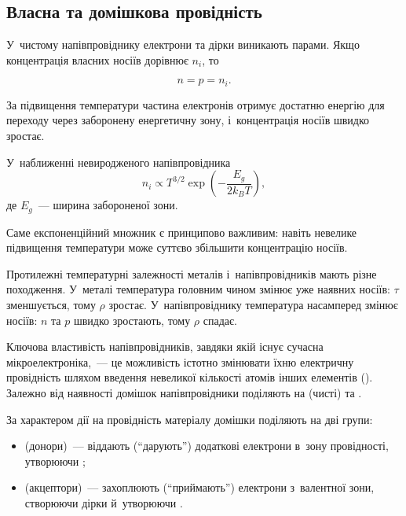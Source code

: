 \subsection*{Власна та домішкова провідність}


У~чистому напівпровіднику електрони та дірки виникають парами. Якщо концентрація власних
носіїв дорівнює $n_i$, то

\begin{equation*}
	n=p=n_i.
\end{equation*}

За підвищення температури частина електронів отримує достатню енергію для переходу через
заборонену енергетичну зону, і~концентрація носіїв швидко зростає.

У~наближенні невиродженого напівпровідника
\begin{equation}\label{eq:IntrinsicConcentration}
	n_i\propto T^{3/2}
	\exp\left(-\frac{E_g}{2k_BT}\right),
\end{equation}
де $E_g$~--- ширина забороненої зони.

Саме експоненційний множник є принципово важливим: навіть невелике підвищення температури
може суттєво збільшити концентрацію носіїв.

\begin{Attention}
	Протилежні температурні залежності металів і~напівпровідників мають різне походження.
	У~металі температура головним чином змінює  уже наявних носіїв:
	$\tau$ зменшується, тому $\rho$ зростає. У~напівпровіднику температура насамперед
	змінює  носіїв: $n$ та $p$ швидко зростають, тому $\rho$ спадає.
\end{Attention}

Ключова властивість напівпровідників, завдяки якій існує сучасна мікроелектроніка,~--- це
можливість істотно змінювати їхню електричну провідність шляхом введення невеликої
кількості атомів інших елементів (). Залежно від наявності домішок
напівпровідники поділяють на  (чисті) та .

За характером дії на провідність матеріалу домішки поділяють на дві групи:
\begin{itemize}
	\item {} (донори)~--- віддають (\enquote{дарують}) додаткові електрони
	  в~зону провідності, утворюючи ;
	\item {} (акцептори)~--- захоплюють (\enquote{приймають}) електрони
	  з~валентної зони, створюючи дірки й~утворюючи .
\end{itemize}

